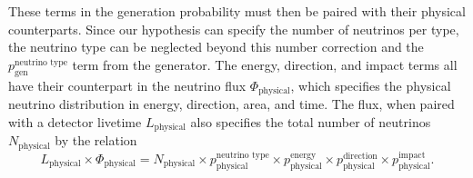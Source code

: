 \documentclass[main.tex]{subfiles}
\begin{document}
These terms in the generation probability must then be paired with their physical counterparts.
Since our hypothesis can specify the number of neutrinos per type, the neutrino type can be neglected beyond this number correction and the $p_\textrm{gen}^\textrm{neutrino type}$ term from the generator.
The energy, direction, and impact terms all have their counterpart in the neutrino flux $\Phi_\textrm{physical}$, which specifies the physical neutrino distribution in energy, direction, area, and time.
The flux, when paired with a detector livetime $L_\textrm{physical}$ also specifies the total number of neutrinos $N_\textrm{physical}$ by the relation
\begin{equation}
L_\textrm{physical} \times \Phi_\textrm{physical} = N_\textrm{physical} \times p_\textrm{physical}^\textrm{neutrino type} \times p_\textrm{physical}^\textrm{energy} \times p_\textrm{physical}^\textrm{direction} \times p_\textrm{physical}^\textrm{impact}.
\end{equation}
\end{document}
